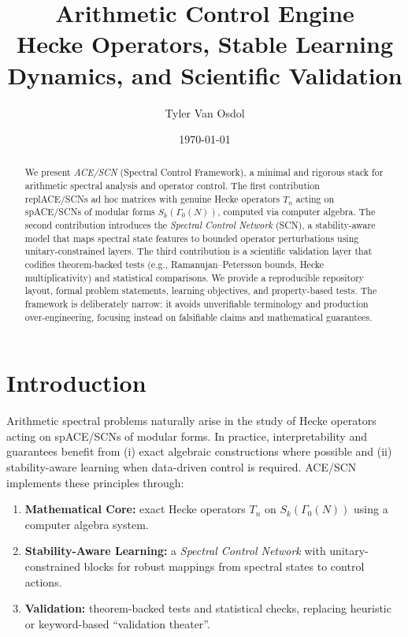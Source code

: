 \documentclass[11pt]{article}
\title{\textbf{Arithmetic Control Engine}\\
\large Hecke Operators, Stable Learning Dynamics, and Scientific Validation}
\author{Tyler Van Osdol}
\date{\today}
\theoremstyle{definition}
\theoremstyle{remark}
\begin{document}
\maketitle

\begin{abstract}
We present \emph{ACE/SCN} (Spectral Control Framework), a minimal and rigorous stack for arithmetic spectral analysis and operator control. 
The first contribution replACE/SCNs ad hoc matrices with genuine Hecke operators \(T_n\) acting on spACE/SCNs of modular forms \(S_k(\Gamma_0(N))\), computed via computer algebra.
The second contribution introduces the \emph{Spectral Control Network} (SCN), a stability-aware model that maps spectral state features to bounded operator perturbations using unitary-constrained layers.
The third contribution is a scientific validation layer that codifies theorem-backed tests (e.g., Ramanujan--Petersson bounds, Hecke multiplicativity) and statistical comparisons.
We provide a reproducible repository layout, formal problem statements, learning objectives, and property-based tests. 
The framework is deliberately narrow: it avoids unverifiable terminology and production over-engineering, focusing instead on falsifiable claims and mathematical guarantees.
\end{abstract}
\newpage
\tableofcontents

\section{Introduction}
\label{sec:intro}
Arithmetic spectral problems naturally arise in the study of Hecke operators acting on spACE/SCNs of modular forms. 
In practice, interpretability and guarantees benefit from (i) exact algebraic constructions where possible and (ii) stability-aware learning when data-driven control is required.
ACE/SCN implements these principles through:
\begin{enumerate}[leftmargin=*,itemsep=2pt]
  \item \textbf{Mathematical Core:} exact Hecke operators \(T_n\) on \(S_k(\Gamma_0(N))\) using a computer algebra system.
  \item \textbf{Stability-Aware Learning:} a \emph{Spectral Control Network} with unitary-constrained blocks for robust mappings from spectral states to control actions.
  \item \textbf{Validation:} theorem-backed tests and statistical checks, replacing heuristic or keyword-based ``validation theater''.
\end{enumerate}
\end{document}
